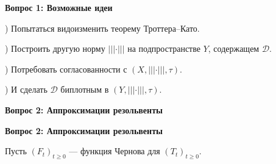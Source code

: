 \documentclass[11pt]{article}
\begin{document}
\newpage

\begin{center}
{\color{notaeYELLOW}\bfseries\fontsize{44}{52}\selectfont Вопрос 1: Возможные идеи}
\end{center}
\vspace*{\fill}
\begin{center}
\fontsize{36}{43}\selectfont
\parbox{\linewidth}{\centering{}) Попытаться видоизменить теорему Троттера--Като.
\par}\vspace{0.4in}
\parbox{\linewidth}{\centering{}) Построить другую норму $|||\cdot|||$ на подпространстве $Y$, содержащем $\mathcal{D}$.
\par}\vspace{0.4in}
\parbox{\linewidth}{\centering{}) Потребовать согласованности с $(X,|||\cdot|||,\tau)$.
\par}\vspace{0.4in}
\parbox{\linewidth}{\centering{}) И сделать $\mathcal{D}$ биплотным в $(Y,|||\cdot|||,\tau)$.
\par}\vspace{0.4in}
\end{center}
\vspace*{\fill}

\newpage

\begin{center}
{\color{notaeYELLOW}\bfseries\fontsize{44}{52}\selectfont Вопрос 2: Аппроксимации резольвенты}
\end{center}
\vspace*{\fill}
\begin{center}
\fontsize{36}{43}\selectfont
\end{center}
\vspace*{\fill}

\newpage

\begin{center}
{\color{notaeYELLOW}\bfseries\fontsize{44}{52}\selectfont Вопрос 2: Аппроксимации резольвенты}
\end{center}
\vspace*{\fill}
\begin{center}
\fontsize{36}{43}\selectfont
\parbox{\linewidth}{\centering\noindent Пусть $(F_t)_{t\ge0}$ --- функция Чернова для $(T_t)_{t\ge0}$.
\par}\vspace{0.4in}
\end{center}
\vspace*{\fill}
\end{document}
